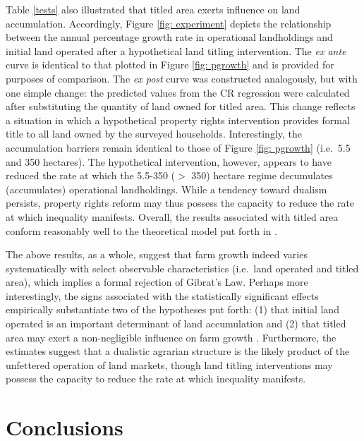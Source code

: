 \documentclass[english]{article}
\begin{document}
Table \ref{tests} also illustrated that titled area exerts influence on land
accumulation. 
Accordingly, Figure \ref{fig: experiment} depicts the relationship between 
the annual percentage growth rate in operational landholdings and initial land 
operated after a hypothetical land titling intervention.
The \emph{ex ante} curve is identical to that plotted in Figure 
\ref{fig: pgrowth} and is provided for purposes of comparison.
The \emph{ex post} curve was constructed analogously, but with one
simple change: the predicted values from the CR regression were calculated
after substituting the quantity of land owned for titled area.
This change reflects a situation in which a hypothetical property rights 
intervention provides formal title to all land owned by the surveyed
households.
Interestingly, the accumulation barriers remain identical to those of Figure
\ref{fig: pgrowth} (i.e.\ 5.5 and 350 hectares).
The hypothetical intervention, however, appears to have reduced the rate at
which the 5.5-350 ($>$ 350) hectare regime decumulates (accumulates) 
operational landholdings.
While a tendency toward dualism persists, property rights reform may 
thus possess the capacity to reduce the rate at which inequality 
manifests. 
Overall, the results associated with titled area conform reasonably well to 
the theoretical model put forth in \citet{carter1998b}.

The above results, as a whole, suggest that farm growth indeed varies 
systematically with select observable characteristics (i.e.\ land operated and 
titled area), which implies a formal rejection of Gibrat's Law. 
Perhaps more interestingly, the signs associated with the statistically 
significant effects empirically substantiate two of the hypotheses put forth: 
(1) that initial land operated is an important determinant of land 
accumulation \citep{carter1993} and (2) that titled area may exert a
non-negligible influence on farm growth \citep{carter1998b}.
Furthermore, the estimates suggest that a dualistic agrarian structure is the 
likely product of the unfettered operation of land markets, though land titling
interventions may possess the capacity to reduce the rate at which inequality 
manifests.


\section{Conclusions}
\label{sec: conclusions}
\end{document}
